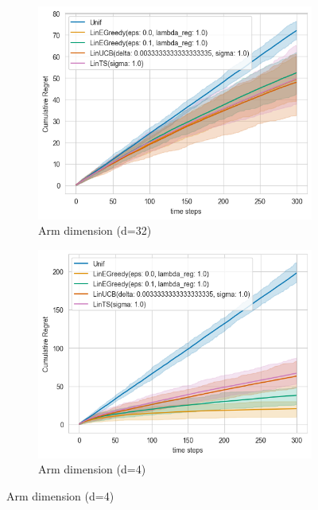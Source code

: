 \begin{figure}[h]
      \centering
      \begin{subfigure}[b]{0.48\textwidth}
          \centering
          \includegraphics[width=\textwidth]{plots/output.png}
          \caption{Arm dimension (d=32)}
      \end{subfigure}
      \hfill
      \begin{subfigure}[b]{0.48\textwidth}
          \centering
          \includegraphics[width=\textwidth]{plots/output1.png}
          \caption{Arm dimension (d=4)}
      \end{subfigure}
\end{figure}

